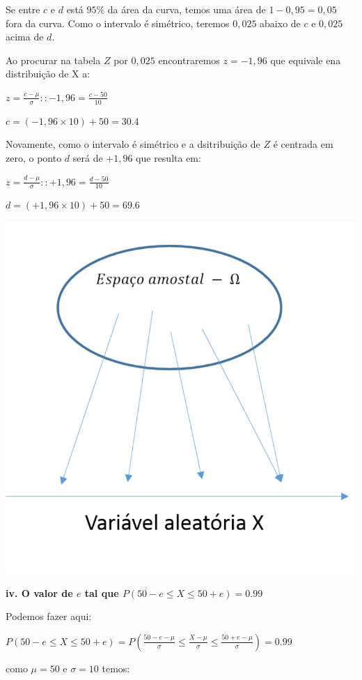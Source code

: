 \documentclass[
]{book}
\begin{document}
Se entre \(c\) e \(d\) está \(95\%\) da área da curva, temos uma área de \(1 - 0,95 = 0,05\) fora da curva. Como o intervalo é simétrico, teremos \(0,025\) abaixo de \(c\) e \(0,025\) acima de \(d\).

Ao procurar na tabela \(Z\) por \(0,025\) encontraremos \(z = -1,96\) que equivale ena distribuição de X a:

\(z = \frac{c - \mu}{\sigma} :: -1,96 = \frac{c - 50}{10}\)

\(c = (-1,96 \times 10) + 50 = 30.4\)

Novamente, como o intervalo é simétrico e a dsitribuição de \(Z\) é centrada em zero, o ponto \(d\) será de +\(1,96\) que resulta em:

\(z = \frac{d - \mu}{\sigma} :: +1,96 = \frac{d - 50}{10}\)

\(d = (+1,96 \times 10) + 50 = 69.6\)

\includegraphics{probest-cambientais_files/figure-latex/unnamed-chunk-97-1.pdf}

\textbf{iv. O valor de \(e\) tal que \(P(50-e \le X \le 50+e) = 0.99\)}

Podemos fazer aqui:

\(P(50-e \le X \le 50+e) = P(\frac{50-e - \mu}{\sigma} \le \frac{X-\mu}{\sigma} \le \frac{50+e-\mu}{\sigma}) = 0.99\)

como \(\mu = 50\) e \(\sigma = 10\) temos:
\end{document}

